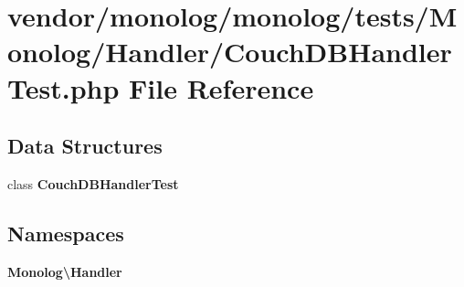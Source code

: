 \section{vendor/monolog/monolog/tests/\+Monolog/\+Handler/\+Couch\+D\+B\+Handler\+Test.php File Reference}
\label{_couch_d_b_handler_test_8php}
\subsection*{Data Structures}
\begin{DoxyCompactItemize}
\item 
class {\bf Couch\+D\+B\+Handler\+Test}
\end{DoxyCompactItemize}
\subsection*{Namespaces}
\begin{DoxyCompactItemize}
\item 
 {\bf Monolog\textbackslash{}\+Handler}
\end{DoxyCompactItemize}
